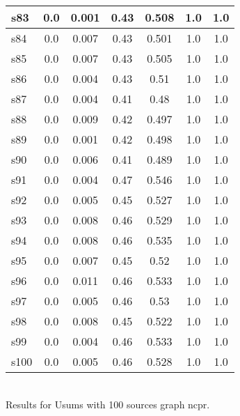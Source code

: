 \documentclass{article}
\begin{document}
\begin{tabular}{|l|c|c|c|c|c|c|}
s83 &0.0 & 0.001 & 0.43 & 0.508 & 1.0 & 1.0\\
\hline
s84 &0.0 & 0.007 & 0.43 & 0.501 & 1.0 & 1.0\\
\hline
s85 &0.0 & 0.007 & 0.43 & 0.505 & 1.0 & 1.0\\
\hline
s86 &0.0 & 0.004 & 0.43 & 0.51 & 1.0 & 1.0\\
\hline
s87 &0.0 & 0.004 & 0.41 & 0.48 & 1.0 & 1.0\\
\hline
s88 &0.0 & 0.009 & 0.42 & 0.497 & 1.0 & 1.0\\
\hline
s89 &0.0 & 0.001 & 0.42 & 0.498 & 1.0 & 1.0\\
\hline
s90 &0.0 & 0.006 & 0.41 & 0.489 & 1.0 & 1.0\\
\hline
s91 &0.0 & 0.004 & 0.47 & 0.546 & 1.0 & 1.0\\
\hline
s92 &0.0 & 0.005 & 0.45 & 0.527 & 1.0 & 1.0\\
\hline
s93 &0.0 & 0.008 & 0.46 & 0.529 & 1.0 & 1.0\\
\hline
s94 &0.0 & 0.008 & 0.46 & 0.535 & 1.0 & 1.0\\
\hline
s95 &0.0 & 0.007 & 0.45 & 0.52 & 1.0 & 1.0\\
\hline
s96 &0.0 & 0.011 & 0.46 & 0.533 & 1.0 & 1.0\\
\hline
s97 &0.0 & 0.005 & 0.46 & 0.53 & 1.0 & 1.0\\
\hline
s98 &0.0 & 0.008 & 0.45 & 0.522 & 1.0 & 1.0\\
\hline
s99 &0.0 & 0.004 & 0.46 & 0.533 & 1.0 & 1.0\\
\hline
s100 &0.0 & 0.005 & 0.46 & 0.528 & 1.0 & 1.0\\
\hline
\end{tabular}\\

\noindent Results for Usums with 100 sources graph ncpr.
\end{document}

